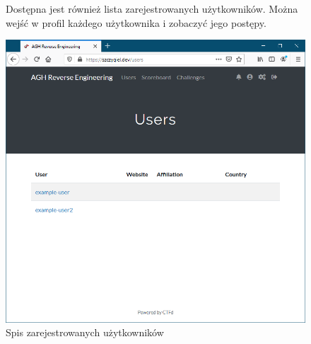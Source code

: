 \documentclass[polish,12pt]{aghthesis}
\begin{document}
\begin{figure}[ht]
    Dostępna jest również lista zarejestrowanych użytkowników.
    Można wejść w profil każdego użytkownika i zobaczyć jego postępy.

    \vspace{1cm}

    \centering
    \includegraphics[width=14cm]{szczygiel_dev_users}
    \caption{Spis zarejestrowanych użytkowników}
    \label{fig:szczygiel_dev_users}
\end{figure}
\end{document}
